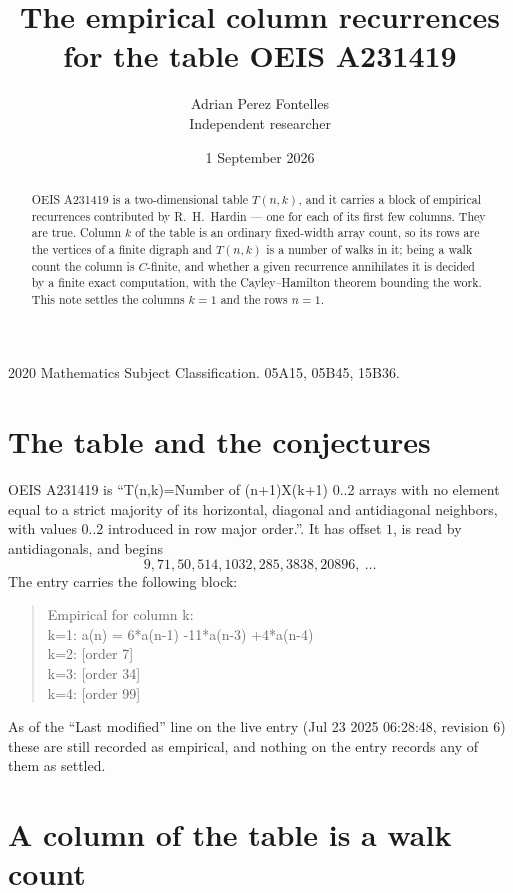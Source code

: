 \documentclass[11pt,a4paper]{article}
\title{The empirical column recurrences for the table OEIS A231419}
\author{Adrian Perez Fontelles\\ \small Independent researcher}
\date{1 September 2026}
\theoremstyle{plain}
\theoremstyle{definition}
\begin{document}
\maketitle

\begin{abstract}
OEIS A231419 is a two-dimensional table $T(n,k)$, and it carries a block of empirical
recurrences contributed by R.~H.~Hardin --- one for each of its first few columns. They are
true. Column $k$ of the table is an ordinary fixed-width array count, so its rows are the
vertices of a finite digraph and $T(n,k)$ is a number of walks in it; being a walk count the
column is $C$-finite, and whether a given recurrence annihilates it is decided by a finite
exact computation, with the Cayley--Hamilton theorem bounding the work. This note settles the columns $k=1$ and the rows $n=1$.
\end{abstract}

\noindent\small 2020 Mathematics Subject Classification. 05A15, 05B45, 15B36.\normalsize

\section{The table and the conjectures}

OEIS A231419 is ``T(n,k)=Number of (n+1)X(k+1) 0..2 arrays with no element equal to a strict majority of its horizontal, diagonal and antidiagonal neighbors, with values 0..2 introduced in row major order.''. It has offset $1$, is
read by antidiagonals, and begins
\[
9, 71, 50, 514, 1032, 285, 3838, 20896,\ \dots
\]
The entry carries the following block:
\begin{quote}\small
Empirical for column k:\\
k=1: a(n) = 6*a(n-1) -11*a(n-3) +4*a(n-4)\\
k=2: [order 7]\\
k=3: [order 34]\\
k=4: [order 99]\\
\end{quote}
As of the ``Last modified'' line on the live entry (Jul 23 2025 06:28:48, revision 6) these are still
recorded as empirical, and nothing on the entry records any of them as settled.

\section{A column of the table is a walk count}
\end{document}
